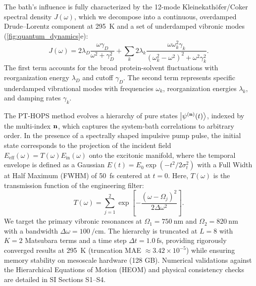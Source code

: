 \documentclass[journal=jpcl,manuscript=letter]{achemso}
\begin{document}
The bath's influence is fully characterized by the 12-mode Kleinekathöfer/Coker spectral density $J(\omega)$, which we decompose into a continuous, overdamped Drude--Lorentz component at \SI{295}{\kelvin} and a set of underdamped vibronic modes (\cref{fig:quantum_dynamics}e):
\begin{equation}
J(\omega) = 2\lambda_D \frac{\omega \gamma_D}{\omega^2 + \gamma_D^2} + \sum_{k} 2\lambda_k \frac{\omega \omega_k^2 \gamma_k}{(\omega_k^2 - \omega^2)^2 + \omega^2 \gamma_k^2}.
\label{eq:spectral_density}
\end{equation}
The first term accounts for the broad protein-solvent fluctuations with reorganization energy $\lambda_D$ and cutoff $\gamma_D$. The second term represents specific underdamped vibrational modes with frequencies $\omega_k$, reorganization energies $\lambda_k$, and damping rates $\gamma_k$.

The PT-HOPS method evolves a hierarchy of pure states $\ket{\psi^{(\vb{n})}(t)}$, indexed by the multi-index $\vb{n}$, which captures the system-bath correlations to arbitrary order. In the presence of a spectrally shaped impulsive pump pulse, the initial state corresponds to the projection of the incident field $E_{\mathrm{eff}}(\omega) = T(\omega) E_{\mathrm{in}}(\omega)$ onto the excitonic manifold, where the temporal envelope is defined as a Gaussian $E(t) = E_0 \exp(-t^2/2\sigma_t^2)$ with a Full Width at Half Maximum (FWHM) of \SI{50}{\femto\second} centered at $t = 0$. Here, $T(\omega)$ is the transmission function of the engineering filter:
\begin{equation}
T(\omega) = \sum_{j=1}^2 \exp\left[ -\frac{(\omega - \Omega_{j})^2}{2\Delta\omega^2} \right].
\label{eq:transmission_function}
\end{equation}
We target the primary vibronic resonances at $\Omega_1 = \SI{750}{\nano\meter}$ and $\Omega_2 = \SI{820}{\nano\meter}$ with a bandwidth $\Delta\omega = \SI{100}{\per\centi\meter}$. The hierarchy is truncated at $L=8$ with $K=2$ Matsubara terms and a time step $\Delta t = \SI{1.0}{\femto\second}$, providing rigorously converged results at \SI{295}{\kelvin} (truncation MAE $\approx 3.42 \times 10^{-5}$) while ensuring memory stability on mesoscale hardware (128 GB). Numerical validations against the Hierarchical Equations of Motion (HEOM) and physical consistency checks are detailed in SI Sections S1--S4.

\end{document}
